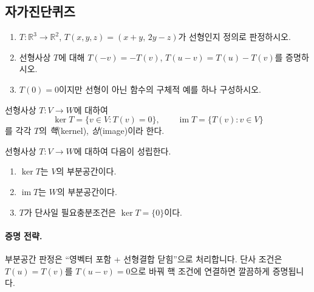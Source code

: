 \subsection*{자가진단퀴즈}
\begin{enumerate}[label=\arabic*.]
\item $T:\mathbb{R}^3\to\mathbb{R}^2$, $T(x,y,z)=(x+y,\,2y-z)$가 선형인지 정의로 판정하시오.
\item 선형사상 $T$에 대해 $T(-v)=-T(v)$, $T(u-v)=T(u)-T(v)$를 증명하시오.
\item $T(0)=0$이지만 선형이 아닌 함수의 구체적 예를 하나 구성하시오.
\end{enumerate}


\begin{definition}
선형사상 $T:V\to W$에 대하여
\[
\ker T=\{v\in V: T(v)=0\},\qquad
\operatorname{im}T=\{T(v): v\in V\}
\]
를 각각 $T$의 \emph{핵}(kernel), \emph{상}(image)이라 한다.
\end{definition}

\begin{theorem}
선형사상 $T:V\to W$에 대하여 다음이 성립한다.
\begin{enumerate}[label=(\roman*)]
\item $\ker T$는 $V$의 부분공간이다.
\item $\operatorname{im}T$는 $W$의 부분공간이다.
\item $T$가 단사일 필요충분조건은 $\ker T=\{0\}$이다.
\end{enumerate}
\end{theorem}

\paragraph{증명 전략.}
부분공간 판정은 ``영벡터 포함 + 선형결합 닫힘''으로 처리합니다. 단사 조건은 $T(u)=T(v)$를 $T(u-v)=0$으로 바꿔 핵 조건에 연결하면 깔끔하게 증명됩니다.

